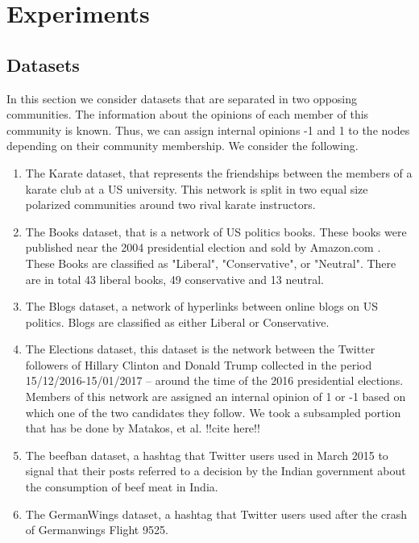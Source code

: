 \chapter{Experiments}
\label{ch:experiments}

\section{Datasets}
\label{sec:ds}

In this section we consider datasets that are separated in two opposing communities. The information about the opinions of each member of this community is known. Thus, we can assign internal opinions -1 and 1 to the nodes depending on their community membership\cite{tsapMatakosTerzi}.  We consider the following.

\begin{enumerate}

  \item The Karate dataset, that represents the friendships between the members of a karate club at a US university. This network is split in two equal size polarized communities around two rival karate instructors.
  
  \item The Books dataset, that is a network of US politics books. These books were published near the 2004 presidential election and sold by Amazon.com . These Books are classified as "Liberal", "Conservative", or "Neutral".  There are in total 43 liberal books, 49 conservative and 13 neutral.
  
  \item The Blogs dataset, a network of hyperlinks between online blogs on US politics. Blogs are classified as either Liberal or Conservative.
  
  \item The Elections dataset, this dataset is the network between the Twitter followers of Hillary Clinton and Donald Trump collected in the period 15/12/2016-15/01/2017 – around the time of the 2016 presidential elections. Members of this network are assigned an internal opinion of 1 or -1 based on which one of the two candidates they follow. We took a subsampled portion that has be done by Matakos, et al. !!cite here!!
  
  \item The beefban dataset, a  hashtag that Twitter users used in March 2015 to signal that their posts referred to a decision by the Indian government about the consumption of beef meat in India.
  
  \item The GermanWings dataset, a  hashtag that Twitter users used after the crash of Germanwings Flight 9525.
  
\end{enumerate}


